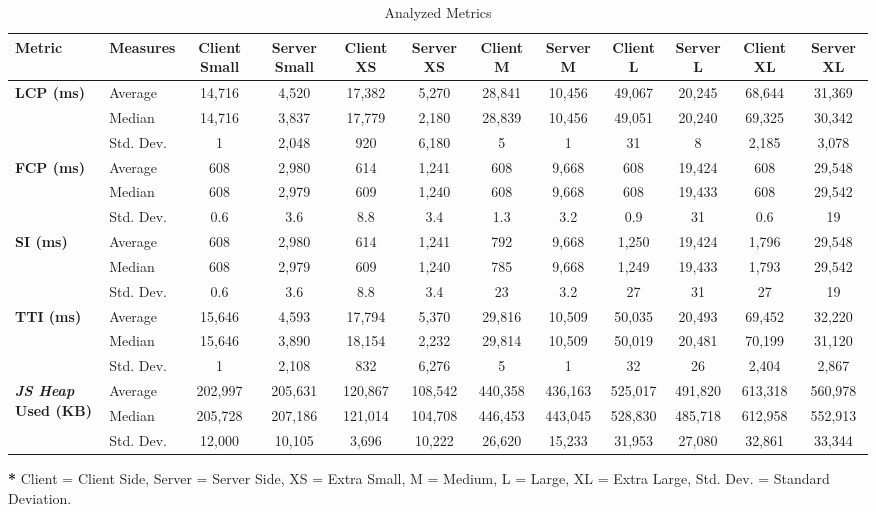
\begin{table}[htbp]
\centering
\scriptsize
\caption{Analyzed Metrics}
\begin{tabular}{|l|l|c|c|c|c|c|c|c|c|c|c|}
\hline
\textbf{Metric} & \textbf{Measures} & \textbf{Client Small} & \textbf{Server Small} & \textbf{Client XS} & \textbf{Server XS} & \textbf{Client M} & \textbf{Server M} & \textbf{Client L} & \textbf{Server L} & \textbf{Client XL} & \textbf{Server XL} \\
\hline
\multirow{3}{*}{\textbf{LCP (ms)}} &
Average & 14,716 & 4,520 & 17,382 & 5,270 & 28,841 & 10,456 & 49,067 & 20,245 & 68,644 & 31,369 \\
& Median & 14,716 & 3,837 & 17,779 & 2,180 & 28,839 & 10,456 & 49,051 & 20,240 & 69,325 & 30,342 \\
& Std. Dev. & 1 & 2,048 & 920 & 6,180 & 5 & 1 & 31 & 8 & 2,185 & 3,078 \\
\hline
\multirow{3}{*}{\textbf{FCP (ms)}} &
Average & 608 & 2,980 & 614 & 1,241 & 608 & 9,668 & 608 & 19,424 & 608 & 29,548 \\
& Median & 608 & 2,979 & 609 & 1,240 & 608 & 9,668 & 608 & 19,433 & 608 & 29,542 \\
& Std. Dev. & 0.6 & 3.6 & 8.8 & 3.4 & 1.3 & 3.2 & 0.9 & 31 & 0.6 & 19 \\
\hline
\multirow{3}{*}{\textbf{SI (ms)}} &
Average & 608 & 2,980 & 614 & 1,241 & 792 & 9,668 & 1,250 & 19,424 & 1,796 & 29,548 \\
& Median & 608 & 2,979 & 609 & 1,240 & 785 & 9,668 & 1,249 & 19,433 & 1,793 & 29,542 \\
& Std. Dev. & 0.6 & 3.6 & 8.8 & 3.4 & 23 & 3.2 & 27 & 31 & 27 & 19 \\
\hline
\multirow{3}{*}{\textbf{TTI (ms)}} &
Average & 15,646 & 4,593 & 17,794 & 5,370 & 29,816 & 10,509 & 50,035 & 20,493 & 69,452 & 32,220 \\
& Median & 15,646 & 3,890 & 18,154 & 2,232 & 29,814 & 10,509 & 50,019 & 20,481 & 70,199 & 31,120 \\
& Std. Dev. & 1 & 2,108 & 832 & 6,276 & 5 & 1 & 32 & 26 & 2,404 & 2,867 \\
\hline
\multirow{3}{*}{\textbf{\textit{JS Heap} Used (KB)}} &
Average & 202,997 & 205,631 & 120,867 & 108,542 & 440,358 & 436,163 & 525,017 & 491,820 & 613,318 & 560,978 \\
& Median & 205,728 & 207,186 & 121,014 & 104,708 & 446,453 & 443,045 & 528,830 & 485,718 & 612,958 & 552,913 \\
& Std. Dev. & 12,000 & 10,105 & 3,696 & 10,222 & 26,620 & 15,233 & 31,953 & 27,080 & 32,861 & 33,344 \\
\hline
\end{tabular}
\vspace{2pt}
\begin{flushleft}
\footnotesize \textbf{*} Client = Client Side, Server = Server Side, XS = Extra Small, M = Medium, L = Large, XL = Extra Large, Std. Dev. = Standard Deviation.
\end{flushleft}
\label{tab:analyzed_metrics}
\end{table}



